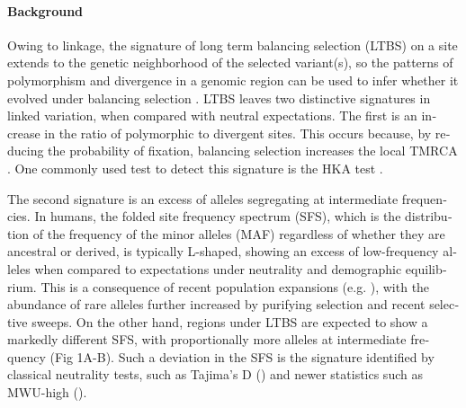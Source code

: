 \begin{refsection}
\begin{otherlanguage}{english}
\paragraph{Background} Owing to linkage, the signature of long term balancing selection (LTBS) on a site extends to the genetic neighborhood of the selected variant(s), so the patterns of polymorphism and divergence in a genomic region can be used to infer whether it evolved under balancing selection \parencite{Charlesworth2006,Andres2011}. LTBS leaves two distinctive signatures in linked variation, when compared with neutral expectations. The first is an increase in the ratio of polymorphic to divergent sites. This occurs because, by reducing the probability of fixation, balancing selection increases the local TMRCA \parencite{Hudson1988}. One commonly used test to detect this signature is the HKA test \parencite{Hudson1987}.

The second signature is an excess of alleles segregating at intermediate frequencies. In humans, the folded  site frequency spectrum (SFS), which is the distribution of the frequency of the minor alleles (MAF) regardless of whether they are ancestral or derived, is typically L-shaped, showing an excess of low-frequency alleles when compared to expectations under neutrality and demographic equilibrium. This is a consequence of recent population expansions (e.g. \cite{Coventry2010}), with the abundance of rare alleles further increased by purifying selection and recent selective sweeps. On the other hand, regions under LTBS are expected to show a markedly different SFS, with proportionally more alleles at intermediate frequency (Fig 1A-B). Such a deviation in the SFS is the signature identified by classical neutrality tests, such as Tajima’s D (\cite{tajima1989statistical}) and newer statistics such as MWU-high (\cite{Nielsen2009}).


\end{otherlanguage}
\end{refsection}
